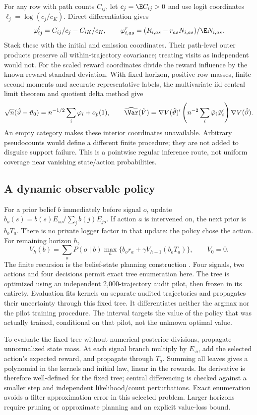 For any row with path counts $C_{ij}$, let $c_j=\E C_{ij}>0$ and use
logit coordinates $\ell_j=\log(c_j/c_K)$. Direct differentiation gives
\[
 \varphi_{ij}^{\ell}=C_{ij}/c_j-C_{iK}/c_K,\qquad
 \varphi_{i,as}^{r}=(R_{i,as}-r_{as}N_{i,as})/\E N_{i,as}.
\]
Stack these with the initial and emission coordinates. Their path-level
outer products preserve all within-trajectory covariance; treating visits
as independent would not. For the scaled reward coordinates divide the
reward influence by the known reward standard deviation. With fixed horizon,
positive row masses, finite second moments and accurate representative
labels, the multivariate iid central limit theorem and quotient delta method
give
\[
 \sqrt n(\hat\vartheta-\vartheta_0)
 =n^{-1/2}\sum_i\varphi_i+o_p(1),\qquad
 \widehat{\Var}(\hat V)=
 \nabla V(\hat\vartheta)'\left(n^{-2}\sum_i\hat\varphi_i\hat\varphi_i'\right)
 \nabla V(\hat\vartheta).
\]
An empty category makes these interior coordinates unavailable. Arbitrary
pseudocounts would define a different finite procedure; they are not added
to disguise support failure. This is a pointwise regular inference route,
not uniform coverage near vanishing state/action probabilities.

\subsection{A dynamic observable policy}
For a prior belief $b$ immediately before signal $o$, update
$b_o(s)=b(s)E_{so}/\sum_jb(j)E_{jo}$. If action $a$ is intervened on, the
next prior is $b_oT_a$. There is no private logger factor in that update:
the policy chose the action. For remaining horizon $h$,
\begin{equation}
 V_h(b)=\sum_oP(o\mid b)\max_a
       \{b_or_a+\gamma V_{h-1}(b_oT_a)\},\qquad V_0=0.
 \label{s6:belief-policy}
\end{equation}
The finite recursion is the belief-state planning construction
\citep{kaelbling1998}. Four signals, two actions and four decisions permit
exact tree enumeration here. The tree is optimized using an independent
2,000-trajectory audit pilot, then frozen in its entirety. Evaluation fits
kernels on separate audited trajectories and propagates their uncertainty
through this fixed tree. It differentiates neither the argmax nor the pilot
training procedure. The interval targets the value of the policy that was
actually trained, conditional on that pilot, not the unknown optimal value.

To evaluate the fixed tree without numerical posterior divisions, propagate
unnormalized state mass. At each signal branch multiply by $E_{\cdot o}$,
add the selected action's expected reward, and propagate through $T_a$.
Summing all leaves gives a polynomial in the kernels and initial law, linear
in the rewards. Its derivative is therefore well-defined for the fixed tree;
central differencing is checked against a smaller step and independent
likelihood/count perturbations. Exact enumeration avoids a filter
approximation error in this selected problem. Larger horizons require
pruning or approximate planning and an explicit value-loss bound.

